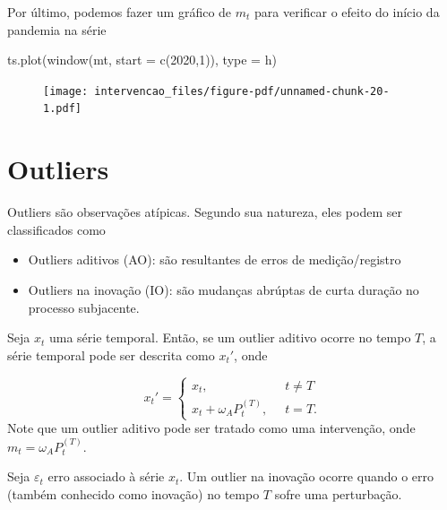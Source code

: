 \documentclass[
  letterpaper,
  DIV=11,
  numbers=noendperiod]{scrartcl}
\newenvironment{Shaded}{\begin{snugshade}}{\end{snugshade}}
\newcommand{\AttributeTok}[1]{\textcolor[rgb]{0.40,0.45,0.13}{#1}}
\newcommand{\DecValTok}[1]{\textcolor[rgb]{0.68,0.00,0.00}{#1}}
\newcommand{\FunctionTok}[1]{\textcolor[rgb]{0.28,0.35,0.67}{#1}}
\newcommand{\NormalTok}[1]{\textcolor[rgb]{0.00,0.23,0.31}{#1}}
\newcommand{\StringTok}[1]{\textcolor[rgb]{0.13,0.47,0.30}{#1}}
\theoremstyle{plain}
\theoremstyle{plain}
\theoremstyle{definition}
\theoremstyle{definition}
\theoremstyle{remark}
\begin{document}
Por último, podemos fazer um gráfico de \(m_t\) para verificar o efeito
do início da pandemia na série

\begin{Shaded}
\begin{Highlighting}[]
\FunctionTok{ts.plot}\NormalTok{(}\FunctionTok{window}\NormalTok{(mt, }\AttributeTok{start =} \FunctionTok{c}\NormalTok{(}\DecValTok{2020}\NormalTok{,}\DecValTok{1}\NormalTok{)), }\AttributeTok{type =} \StringTok{\textquotesingle{}h\textquotesingle{}}\NormalTok{)}
\end{Highlighting}
\end{Shaded}

\begin{figure}[H]

{\centering \texttt{[image: intervencao\_files/figure-pdf/unnamed-chunk-20-1.pdf]}

}

\end{figure}

\hypertarget{outliers}{%
\section{Outliers}\label{outliers}}

Outliers são observações atípicas. Segundo sua natureza, eles podem ser
classificados como

\begin{itemize}
\item
  Outliers aditivos (AO): são resultantes de erros de medição/registro
\item
  Outliers na inovação (IO): são mudanças abrúptas de curta duração no
  processo subjacente.
\end{itemize}

Seja \(x_t\) uma série temporal. Então, se um outlier aditivo ocorre no
tempo \(T\), a série temporal pode ser descrita como \(x_t'\), onde

\[x_t'=\left\{\begin{array}{ll}x_t,&\;\;t\neq T\\ x_t+\omega_AP_t^{(T)},&\;\;t=T.\end{array}\right.\]
Note que um outlier aditivo pode ser tratado como uma intervenção, onde
\(m_t=\omega_A P_t^{(T)}\).

Seja \(\varepsilon_t\) erro associado à série \(x_t\). Um outlier na
inovação ocorre quando o erro (também conhecido como inovação) no tempo
\(T\) sofre uma perturbação.
\end{document}
